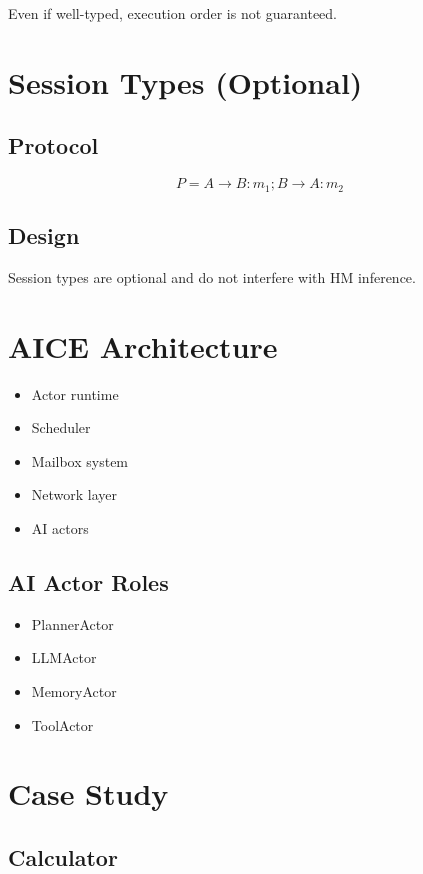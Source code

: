 \documentclass[11pt]{article}
\begin{document}
Even if well-typed, execution order is not guaranteed.

\section{Session Types (Optional)}

\subsection{Protocol}

\[
P = A \rightarrow B : m_1 ; B \rightarrow A : m_2
\]

\subsection{Design}

Session types are optional and do not interfere with HM inference.

\section{AICE Architecture}

\begin{itemize}
\item Actor runtime
\item Scheduler
\item Mailbox system
\item Network layer
\item AI actors
\end{itemize}

\subsection{AI Actor Roles}

\begin{itemize}
\item PlannerActor
\item LLMActor
\item MemoryActor
\item ToolActor
\end{itemize}

\section{Case Study}

\subsection{Calculator}
\end{document}
